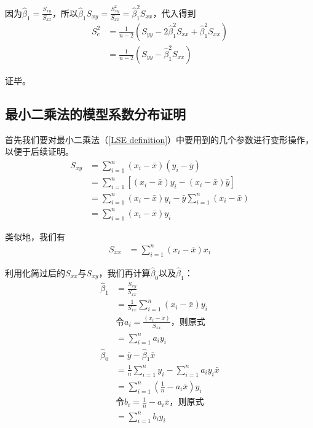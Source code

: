 \documentclass{MGLSA-cn-book-math}
\begin{document}
因为$\hat\beta_1=\frac{S_{xy}}{S_{xx}}$，所以$\hat\beta_1S_{xy}=\frac{S_{xy}^2}{S_{xx}}=\hat\beta_1^2S_{xx}$，代入得到
\begin{align*}
	S_e^2&=\frac{1}{n-2}(S_{yy}-2\hat\beta_1^2S_{xx}+\hat\beta_1^2S_{xx})\\
	&=\frac{1}{n-2}(S_{yy}-\hat\beta_1^2S_{xx})
\end{align*}

证毕。

\subsection{最小二乘法的模型系数分布证明}
\label{proof17}
首先我们要对最小二乘法（\ref{LSE definition}）中要用到的几个参数进行变形操作，以便于后续证明。
\begin{align*}
	S_{xy}&=\sum_{i=1}^n(x_i-\bar x)(y_i-\bar y)\\
	&=\sum_{i=1}^n[(x_i-\bar x)y_i-(x_i-\bar x)\bar y]\\
	&=\sum_{i=1}^n(x_i-\bar x)y_i-\bar y\sum_{i=1}^n(x_i-\bar x)\\
	&=\sum_{i=1}^n(x_i-\bar x)y_i
\end{align*}

类似地，我们有
\begin{align*}
	S_{xx}&=\sum_{i=1}^n(x_i-\bar x)x_i
\end{align*}

利用化简过后的$S_{xx}$与$S_{xy}$，我们再计算$\hat\beta_0$以及$\hat\beta_1$：
\begin{align*}
	\hat\beta_1&=\frac{S_{xy}}{S_{xx}}\\
	&=\frac{1}{S_{xx}}\sum_{i=1}^n(x_i-\bar x)y_i\\
	&\text{令$a_i=\frac{(x_i-\bar x)}{S_{xx}}$，则原式}\\
	&=\sum_{i=1}^na_iy_i\\
	\hat\beta_0&=\bar y-\hat\beta_1\bar x\\
	&=\frac{1}{n}\sum_{i=1}^ny_i-\sum_{i=1}^na_iy_i\bar x\\
	&=\sum_{i=1}^n(\frac{1}{n}-a_i\bar x)y_i\\
	&\text{令$b_i=\frac{1}{n}-a_i\bar x$，则原式}\\
	&=\sum_{i=1}^nb_iy_i
\end{align*}
\end{document}
